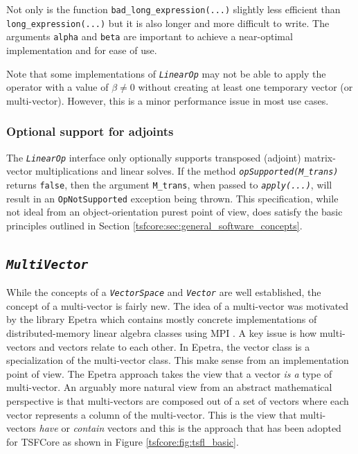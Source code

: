 Not only is the function \texttt{bad\-\_long\-\_expression(\-...)}
slightly less efficient than \texttt{long\-\_expression(\-...)} but it
is also longer and more difficult to write.  The arguments
\texttt{alpha} and \texttt{beta} are important to achieve a near-optimal
implementation and for ease of use.

Note that some implementations of \texttt{\textit{LinearOp}} may not be
able to apply the operator with a value of $\beta \ne 0$ without
creating at least one temporary vector (or multi-vector).  However,
this is a minor performance issue in most use cases.

%
\subsubsection{Optional support for adjoints}
\label{tsfcore:sec:linear_op_adjoints}
%

The \texttt{\textit{LinearOp}} interface only optionally supports
transposed (adjoint) matrix-vector multiplications and linear solves.
If the method \texttt{\textit{opSupported(M\_trans)}} returns
\texttt{false}, then the argument \texttt{M\_trans}, when
passed to \texttt{\textit{apply(\-...)}}, will result in an
\texttt{OpNotSupported} exception being thrown.
This specification, while not ideal from an object-orientation purest
point of view, does satisfy the basic principles outlined in Section
\ref{tsfcore:sec:general_software_concepts}.

%
\subsection{\texttt{\textit{Multi\-Vector}}}
\label{tsfcore:sec:multi_vec}
%

While the concepts of a \texttt{\textit{VectorSpace}} and
\texttt{\textit{Vector}} are well established, the
concept of a multi-vector is fairly new.  The idea of a multi-vector
was motivated by the library Epetra \cite{ref:Epetra} which contains
mostly concrete implementations of distributed-memory linear algebra
classes using MPI \cite{ref:mpi}.  A key issue is how multi-vectors
and vectors relate to each other.  In Epetra, the vector class is a
specialization of the multi-vector class.  This make sense from an
implementation point of view.  The Epetra approach takes the view that
a vector {\em is a} type of multi-vector.  An arguably more natural
view from an abstract mathematical perspective is that multi-vectors
are composed out of a set of vectors where each vector represents a
column of the multi-vector.  This is the view that multi-vectors {\em
have} or {\em contain} vectors and this is the approach that has been
adopted for TSFCore as shown in Figure \ref{tsfcore:fig:tsfl_basic}.

